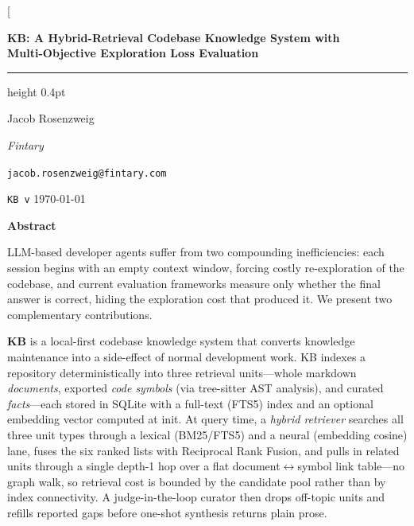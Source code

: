 \documentclass[10pt,twocolumn]{article}
\begin{document}
\twocolumn[
  \begin{center}
    {\LARGE\bfseries KB: A Hybrid-Retrieval Codebase Knowledge System with\\
    Multi-Objective Exploration Loss Evaluation\par}
    \vspace{0.85em}
    \hrule height 0.4pt
    \vspace{1.1em}
    {\normalsize Jacob Rosenzweig\par}
    \vspace{0.45em}
    {\normalsize\textit{Fintary}\par}
    \vspace{0.35em}
    {\normalsize\texttt{jacob.rosenzweig@fintary.com}\par}
    \vspace{0.55em}
    {\small\texttt{KB v\kbversion} \enspace\textbullet\enspace \today\par}
    \vspace{1.35em}
  \end{center}

  \begin{center}
    \textbf{Abstract}
  \end{center}
  \vspace{0.55em}
  \noindent
  LLM-based developer agents suffer from two compounding inefficiencies: each
  session begins with an empty context window, forcing costly re-exploration of
  the codebase, and current evaluation frameworks measure only whether the final
  answer is correct, hiding the exploration cost that produced it.  We present
  two complementary contributions.

  \textbf{KB} is a local-first codebase knowledge system that
  converts knowledge maintenance into a side-effect of normal development work.
  KB indexes a repository deterministically into three retrieval units---whole
  markdown \emph{documents}, exported \emph{code symbols} (via tree-sitter AST
  analysis), and curated \emph{facts}---each stored in SQLite with a full-text
  (FTS5) index and an optional embedding vector computed at init.  At query time,
  a \emph{hybrid retriever} searches all three unit types through a lexical
  (BM25/FTS5) and a neural (embedding cosine) lane, fuses the six ranked lists
  with Reciprocal Rank Fusion, and pulls in related units through a single
  depth-1 hop over a flat document$\leftrightarrow$symbol link table---no graph
  walk, so retrieval cost is bounded by the candidate pool rather than by index
  connectivity.  A judge-in-the-loop curator then drops off-topic units and
  refills reported gaps before one-shot synthesis returns plain prose.
\end{document}
